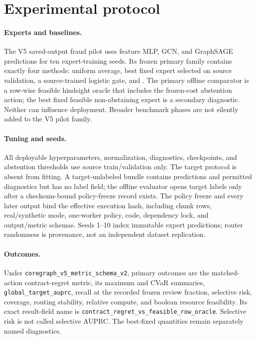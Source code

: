 \section{Experimental protocol}



\paragraph{Experts and baselines.}
The V5 saved-output fraud pilot uses feature MLP, GCN, and GraphSAGE predictions for ten expert-training seeds. Its frozen primary family contains exactly four methods: uniform average, best fixed expert selected on source validation, a source-trained logistic gate, and \method{}. The primary offline comparator is a row-wise feasible hindsight oracle that includes the frozen-cost abstention action; the best fixed feasible non-abstaining expert is a secondary diagnostic. Neither can influence deployment. Broader benchmark phases are not silently added to the V5 pilot family.

\paragraph{Tuning and seeds.}
All deployable hyperparameters, normalization, diagnostics, checkpoints, and abstention thresholds use source train/validation only. The target protocol is absent from fitting. A target-unlabeled bundle contains predictions and permitted diagnostics but has no label field; the offline evaluator opens target labels only after a checksum-bound policy-freeze record exists. The policy freeze and every later output bind the effective execution hash, including chunk rows, real/synthetic mode, one-worker policy, code, dependency lock, and output/metric schemas. Seeds 1--10 index immutable expert predictions; router randomness is provenance, not an independent dataset replication.

\paragraph{Outcomes.}
Under \texttt{coregraph\_v5\_metric\_schema\_v2}, primary outcomes are the matched-action contract-regret metric, its maximum and CVaR summaries, \texttt{global\_target\_auprc}, recall at the recorded frozen review fraction, selective risk, coverage, routing stability, relative compute, and boolean resource feasibility. Its exact result-field name is \texttt{contract\_\allowbreak{}regret\_\allowbreak{}vs\_\allowbreak{}feasible\_\allowbreak{}row\_\allowbreak{}oracle}. Selective risk is not called selective AUPRC. The best-fixed quantities remain separately named diagnostics.

